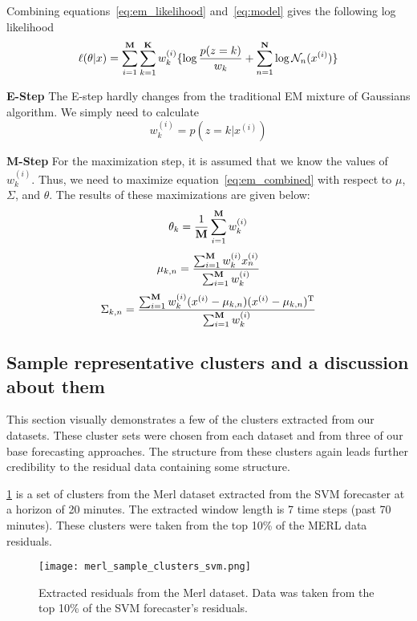 Combining equations~\ref{eq:em_likelihood} and~\ref{eq:model} gives the following log likelihood
\begin{equation}
\label{eq:em_combined}
\ell(\theta|x) = \sum_{i = 1}^{{\bf M}}\sum_{k = 1}^{{\bf K}}w_{k}^{(i)}\{ \log\frac{p(z = k)}{w_{k}} + \sum_{n = 1}^{{\bf N}} \log \mathcal{N}_{n}(x^{(i)})\}
\end{equation}

\textbf{E-Step}
The E-step hardly changes from the traditional EM mixture of Gaussians algorithm.  We simply need to calculate 
\begin{equation}
w^{(i)}_{k} = p(z = k|x^{(i)})
\end{equation}

\textbf{M-Step}
For the maximization step, it is assumed that we know the values of $w_{k}^{(i)}$.  Thus, we need to maximize equation~\ref{eq:em_combined} with respect to $\mu$,  $\Sigma$, and $\theta$.
The results of these maximizations are given below:
\begin{equation}
\theta_{k} = \frac{1}{{\bf M}}\sum_{i = 1}^{{\bf M}}w_{k}^{(i)}
\end{equation}
\begin{equation}
\mu_{k, n} = \frac{\sum_{i = 1}^{{\bf M}}w_{k}^{(i)}x^{(i)}_{n}}{\sum_{i = 1}^{{\bf M}}w_{k}^{(i)}}
\end{equation}
\begin{equation}
\Sigma_{k, n} = \frac{\sum_{i = 1}^{{\bf M}}w_{k}^{(i)}(x^{(i)} - \mu_{k, n})(x^{(i)} - \mu_{k, n})^{\mathrm{T}}}{\sum_{i = 1}^{{\bf M}}w_{k}^{(i)}}
\end{equation}


\subsection{Sample representative clusters and a discussion about them}
This section visually demonstrates a few of the clusters extracted from our datasets.  These cluster sets were chosen from each dataset and from three of our base forecasting approaches.  The structure from these clusters again leads further credibility to the residual data containing some structure.  

\ref{fig:merl_clusters} is a set of clusters from the Merl dataset extracted from the SVM forecaster at a horizon of 20 minutes.  The extracted window length is 7 time steps (past 70 minutes).  These clusters were taken from the top 10\% of the MERL data residuals.

\begin{figure}
	\begin{center}
		\texttt{[image: merl\_sample\_clusters\_svm.png]}
	\end{center}
	\caption{Extracted residuals from the Merl dataset.  Data was taken from the top 10\% of the SVM forecaster's residuals.}
	\label{fig:merl_clusters}
\end{figure}

